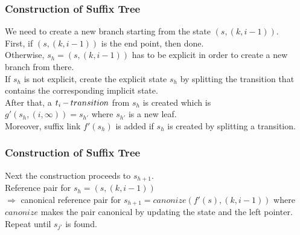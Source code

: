 \documentclass[compress,usenames,dvipsnames]{beamer}
\DeclareMathOperator{\atrans}{\mathnormal{-}}
\begin{document}
			\begin{frame}\frametitle{Construction of Suffix Tree}
                We need to create a new branch starting from the state $(s, (k, i - 1))$. \\
                \hfill \break
                First, if $(s, (k, i - 1))$ is the end point, then done. \\
                Otherwise, $s_h = (s, (k, i - 1))$ has to be explicit in order to create a new branch from there. \\
                \hfill \break
                If $s_h$ is not explicit, create the explicit state $s_h$ by splitting the transition that contains the corresponding implicit state. \\
                After that, a $t_i\atrans transition$ from $s_h$ is created which is \\
                $g'(s_h, (i, \infty)) = s_{h'}$ where $s_{h'}$ is a new leaf. \\
                Moreover, suffix link $f'(s_h)$ is added if $s_h$ is created by splitting a transition.
            \end{frame}

			\begin{frame}\frametitle{Construction of Suffix Tree}
                Next the construction proceeds to $s_{h+1}$. \\
                \hfill \break
                Reference pair for $s_h = (s, (k, i - 1)) $ \\ 
                $\Rightarrow $ canonical reference pair for $s_{h+1} = canonize(f'(s), (k, i-1))$ where $canonize$ makes the pair canonical by updating the state and the left pointer. \\
                \hfill \break
                Repeat until $s_{j'}$ is found.
            \end{frame}
\end{document}
